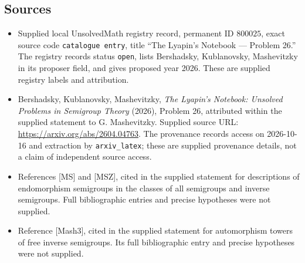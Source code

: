 \documentclass[11pt]{article}
\begin{document}
\subsection{Sources}
\begin{itemize}
\item Supplied local UnsolvedMath registry record, permanent ID \(800025\), exact source code \texttt{catalogue entry}, title ``The Lyapin's Notebook --- Problem 26.'' The registry records status \texttt{open}, lists Bershadsky, Kublanovsky, Mashevitzky in its proposer field, and gives proposed year 2026. These are supplied registry labels and attribution.
\item Bershadsky, Kublanovsky, Mashevitzky, \emph{The Lyapin's Notebook: Unsolved Problems in Semigroup Theory} (2026), Problem 26, attributed within the supplied statement to G. Mashevitzky. Supplied source URL: \url{https://arxiv.org/abs/2604.04763}. The provenance records access on 2026-10-16 and extraction by \texttt{arxiv\_latex}; these are supplied provenance details, not a claim of independent source access.
\item References [MS] and [MSZ], cited in the supplied statement for descriptions of endomorphism semigroups in the classes of all semigroups and inverse semigroups. Full bibliographic entries and precise hypotheses were not supplied.
\item Reference [Mash3], cited in the supplied statement for automorphism towers of free inverse semigroups. Its full bibliographic entry and precise hypotheses were not supplied.
\end{itemize}
\end{document}
